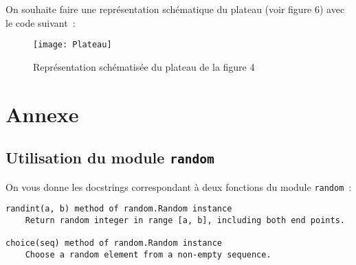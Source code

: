 On souhaite faire une représentation schématique du plateau (voir figure 6) avec le code suivant~: 

\noindent

\begin{figure}[h]
	\begin{center}
		\texttt{[image: Plateau]}
	\end{center}
	\caption{Représentation schématisée du plateau de la figure 4}
	\label{fig:2}
\end{figure}


%	








\section*{Annexe}

\subsection*{Utilisation du module \texttt{random}}

On vous donne les docstrings correspondant à deux fonctions du module \texttt{random}~: 

\begin{lstlisting}
randint(a, b) method of random.Random instance
    Return random integer in range [a, b], including both end points.
	
choice(seq) method of random.Random instance
    Choose a random element from a non-empty sequence.
\end{lstlisting}

